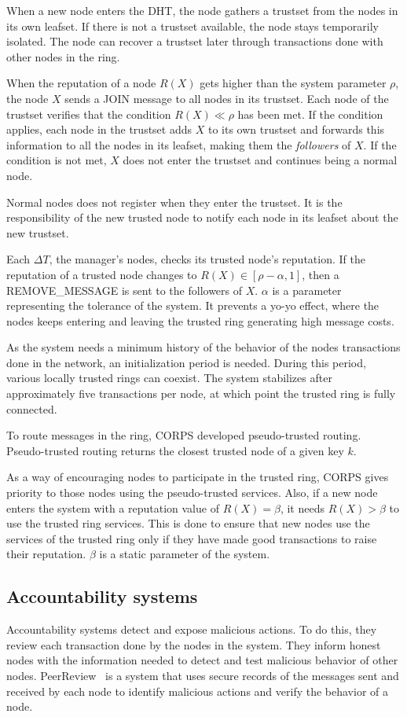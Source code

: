 When a new node enters the DHT, the node gathers a trustset from the nodes in its own
leafset. If there is not a trustset available, the node stays temporarily
isolated. The node can recover a trustset later through transactions done with
other nodes in the ring.

When the reputation of a node $R(X)$ gets higher than the system parameter
$\rho$, the node $X$ sends a JOIN message to all nodes in its trustset. Each
node of the trustset verifies that the condition $R(X) \ll \rho$ has been met.
If the condition  applies, each node in the trustset adds $X$ to its own trustset
and forwards this information to all the nodes in its leafset, making them the
\textit{followers} of $X$.
If the condition is not met, $X$ does not enter the trustset and continues
being a normal node.

Normal nodes does not register when they enter the trustset. It is the
responsibility of the new trusted node to notify each node in its leafset about
the new trustset.

Each $\Delta T$, the manager's nodes, checks its trusted node's reputation. If
the reputation of a trusted node changes to $R(X) \in [\rho -\alpha, 1]$, then
a REMOVE\_MESSAGE is sent to the followers of $X$. $\alpha$ is a parameter
representing the tolerance of the system. It prevents a yo-yo effect, where the nodes keeps entering and
leaving the trusted ring generating high message costs.

As the system needs a minimum history of the behavior of the nodes transactions
done in the network, an initialization period is needed. During this period,
various locally trusted rings can coexist.
The system stabilizes after approximately five transactions per node, at which
point the trusted ring is fully connected.

To route messages in the ring, CORPS developed pseudo-trusted routing. Pseudo-trusted routing returns the closest trusted node of a given key $k$.

As a way of encouraging nodes to participate in the trusted ring, CORPS gives
priority to those nodes using the pseudo-trusted services.
Also, if a new node enters the system with a reputation value of $R(X) =
\beta$, it needs $R(X) > \beta$ to use the trusted ring services. This is
done to ensure that new nodes use the services of the trusted ring only if they
have made good transactions to raise their reputation. $\beta$ is a static parameter of the
system. 


\subsection{Accountability systems}
Accountability systems detect and expose malicious actions.
To do this, they review each transaction done by the nodes in the system. They
inform honest nodes with the information needed to detect and test
malicious behavior of other nodes. PeerReview~\cite{haeberlen2007peerreview} is a system that
uses secure records of the messages sent and received by each node to identify
malicious actions and verify the behavior of a node.

